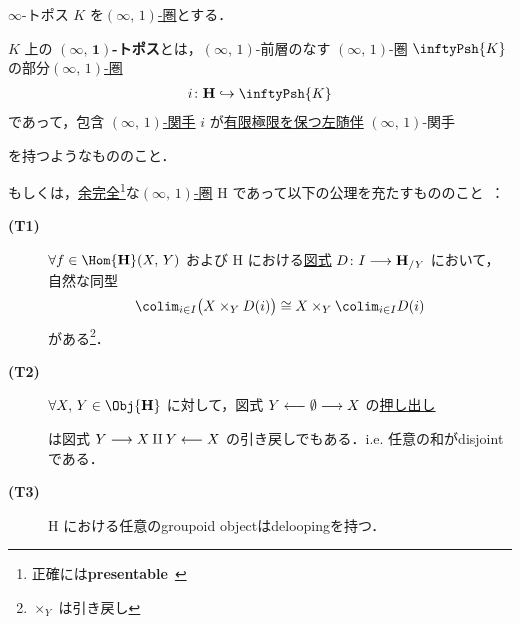 \documentclass[TQFT_main]{subfiles}
\begin{document}
\begin{mydef}[label=def:infinity-topos]{$\infty$-トポス}
    $K$ を\hyperref[def:infinity-1]{$(\infty,\, 1)$-圏}とする．
    
    $K$ 上の $\bm{(\infty,\, 1)}$\textbf{-トポス}とは，$(\infty,\, 1)$-前層のなす $(\infty,\, 1)$-圏 $\inftyPsh{K}$ の部分\hyperref[def:infinity-1]{$(\infty,\, 1)$-圏}
    \begin{align}
        i \colon \bm{\mathrm{H}} \hookrightarrow \inftyPsh{K}
    \end{align}
    であって，包含 \hyperref[def:infinity-1]{$(\infty,\, 1)$-関手} $i$ が\hyperref[def:colim]{有限極限を保つ}\hyperref[def:adjoint]{左随伴} $(\infty,\, 1)$-関手
    \begin{center}
    \end{center}
    を持つようなもののこと．

    \tcblower

    もしくは，\hyperref[def:complete]{余完全}\footnote{正確には\textbf{presentable}~\cite[p.372, Def5.5.0.18]{lurie2008higher}}な\hyperref[def:infinity-1]{$(\infty,\, 1)$-圏} $\bm{\mathrm{H}}$ であって以下の公理を充たすもののこと~\cite[p.9, Definition5.4]{NSS2012}：
    \begin{description}
        \item[\textbf{(T1)}] $\forall f \in \Hom{\bm{\mathrm{H}}}(X,\, Y)$ および $\bm{\mathrm{H}}$ における\hyperref[def:diagram]{図式} $D \colon I \longrightarrow \bm{\mathrm{H}}_{/Y}$ において，自然な同型
        \begin{align}
            \colim_{i \in I} \bigl( X \times_Y D(i) \bigr) \cong X \times_Y \colim_{i \in I} D(i)
        \end{align}
        がある\footnote{$\times_Y$ は引き戻し}．
        \item[\textbf{(T2)}] $\forall X,\, Y \in \Obj{\bm{\mathrm{H}}}$ に対して，図式 $Y \longleftarrow \emptyset \longrightarrow X$ の\hyperref[def:colim]{押し出し}
        \begin{center}
        \end{center}
        は図式 $Y \longrightarrow X \amalg Y \longleftarrow X$ の引き戻しでもある．i.e. 任意の和がdisjointである．
        \item[\textbf{(T3)}] $\bm{\mathrm{H}}$ における任意のgroupoid objectはdeloopingを持つ．
    \end{description}
    
\end{mydef}
\end{document}
